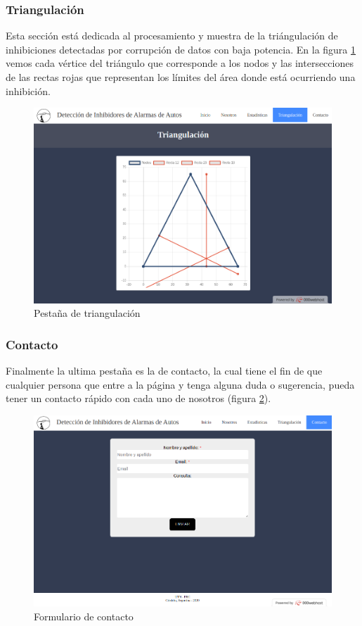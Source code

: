 \subsubsection{Triangulación}
\par Esta sección está dedicada al procesamiento y muestra de la triángulación de inhibiciones detectadas por corrupción de
 datos con baja potencia. En la figura \ref{web_triangulacion} vemos cada vértice del triángulo que corresponde a los nodos 
 y las intersecciones de las rectas rojas que representan los límites del área donde está ocurriendo una inhibición. 

\begin{figure}[h!]
	\centering
	\includegraphics[scale=0.34]{images/web/triangulacion-web.png}
    \caption{Pestaña de triangulación}
	\label{web_triangulacion}
\end{figure}
\subsubsection{Contacto}
Finalmente la ultima pestaña es la de contacto, la cual tiene el fin de que cualquier persona que entre a la página y tenga alguna duda o sugerencia, pueda tener un contacto rápido con cada uno de nosotros (figura \ref{web_contacto}).
\begin{figure}[h!]
	\centering
	\includegraphics[scale=0.33]{images/web/contacto-web.png}
    \caption{Formulario de contacto}
	\label{web_contacto}
\end{figure}
